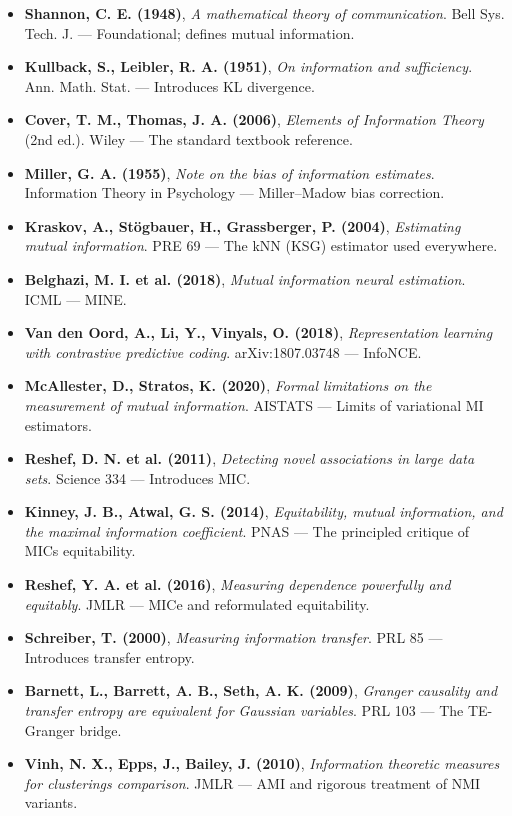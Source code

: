 \documentclass{article}
\providecommand{\tightlist}{\setlength{\itemsep}{0pt}\setlength{\parskip}{0pt}}
\begin{document}
\begin{itemize}
\tightlist
\item
  \textbf{Shannon, C. E. (1948)}, \emph{A mathematical theory of
  communication}. Bell Sys. Tech. J. --- Foundational; defines mutual
  information.
\item
  \textbf{Kullback, S., Leibler, R. A. (1951)}, \emph{On information and
  sufficiency}. Ann. Math. Stat. --- Introduces KL divergence.
\item
  \textbf{Cover, T. M., Thomas, J. A. (2006)}, \emph{Elements of
  Information Theory} (2nd ed.). Wiley --- The standard textbook
  reference.
\item
  \textbf{Miller, G. A. (1955)}, \emph{Note on the bias of information
  estimates}. Information Theory in Psychology --- Miller--Madow bias
  correction.
\item
  \textbf{Kraskov, A., Stögbauer, H., Grassberger, P. (2004)},
  \emph{Estimating mutual information}. PRE 69 --- The kNN (KSG)
  estimator used everywhere.
\item
  \textbf{Belghazi, M. I. et al. (2018)}, \emph{Mutual information
  neural estimation}. ICML --- MINE.
\item
  \textbf{Van den Oord, A., Li, Y., Vinyals, O. (2018)},
  \emph{Representation learning with contrastive predictive coding}.
  arXiv:1807.03748 --- InfoNCE.
\item
  \textbf{McAllester, D., Stratos, K. (2020)}, \emph{Formal limitations
  on the measurement of mutual information}. AISTATS --- Limits of
  variational MI estimators.
\item
  \textbf{Reshef, D. N. et al. (2011)}, \emph{Detecting novel
  associations in large data sets}. Science 334 --- Introduces MIC.
\item
  \textbf{Kinney, J. B., Atwal, G. S. (2014)}, \emph{Equitability,
  mutual information, and the maximal information coefficient}. PNAS ---
  The principled critique of MIC\textquotesingle s equitability.
\item
  \textbf{Reshef, Y. A. et al. (2016)}, \emph{Measuring dependence
  powerfully and equitably}. JMLR --- MICe and reformulated
  equitability.
\item
  \textbf{Schreiber, T. (2000)}, \emph{Measuring information transfer}.
  PRL 85 --- Introduces transfer entropy.
\item
  \textbf{Barnett, L., Barrett, A. B., Seth, A. K. (2009)},
  \emph{Granger causality and transfer entropy are equivalent for
  Gaussian variables}. PRL 103 --- The TE-Granger bridge.
\item
  \textbf{Vinh, N. X., Epps, J., Bailey, J. (2010)}, \emph{Information
  theoretic measures for clusterings comparison}. JMLR --- AMI and
  rigorous treatment of NMI variants.
\end{itemize}
\end{document}

